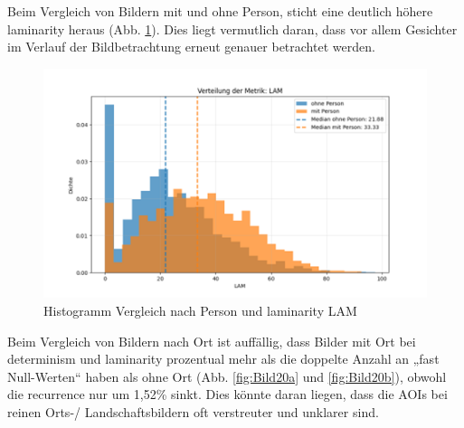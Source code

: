 \documentclass[
    language=german, %
    thesis=seminar, %
    supervisor=postdoc, %
    multiauthor=true, %
    ]{settings/csssa-thesis}
\begin{document}
Beim Vergleich von Bildern mit und ohne Person, sticht eine deutlich höhere laminarity heraus (Abb. \ref{fig:bild19}). 
Dies liegt vermutlich daran, dass vor allem Gesichter im Verlauf der Bildbetrachtung erneut genauer betrachtet werden. 

\begin{figure}[h]
    \centering
    \includegraphics[width=\linewidth,height=0.8\textheight,keepaspectratio]{figures/Bild23.png}
    \caption{Histogramm Vergleich nach Person und laminarity LAM}\label{fig:bild19}
\end{figure}

Beim Vergleich von Bildern nach Ort ist auffällig, dass Bilder mit Ort bei determinism und laminarity 
prozentual mehr als die doppelte Anzahl an „fast Null-Werten“ haben als ohne Ort (Abb. \ref{fig:Bild20a} und \ref{fig:Bild20b}), 
obwohl die recurrence nur um 1,52\% sinkt. Dies könnte daran liegen, dass die AOIs bei reinen 
Orts-/ Landschaftsbildern oft verstreuter und unklarer sind. 
\end{document}
